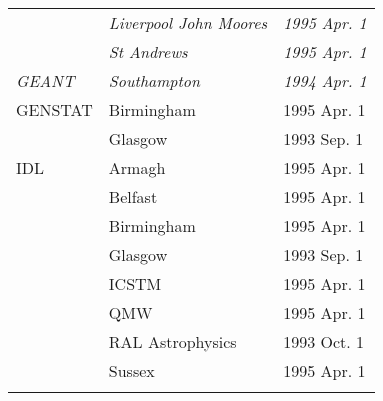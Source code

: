 \begin{table}
\begin{center}
\begin{tabular}{|p{36mm}|p{50mm}|p{30mm}|}
                      & {\em Liverpool John Moores} & {\em 1995 Apr. 1} \\
                      & {\em St Andrews} & {\em 1995 Apr. 1} \\
{\em GEANT}           & {\em Southampton} & {\em 1994 Apr. 1} \\
GENSTAT               & Birmingham       & 1995 Apr. 1 \\
                      & Glasgow          & 1993 Sep. 1 \\
IDL                   & Armagh           & 1995 Apr. 1 \\
                      & Belfast          & 1995 Apr. 1 \\
                      & Birmingham       & 1995 Apr. 1 \\
                      & Glasgow          & 1993 Sep. 1 \\
                      & ICSTM            & 1995 Apr. 1 \\
                      & QMW              & 1995 Apr. 1 \\
                      & RAL Astrophysics & 1993 Oct. 1 \\
                      & Sussex           & 1995 Apr. 1 \\
& & \\ \hline
\end{tabular}
\end{center}
\end{table}

